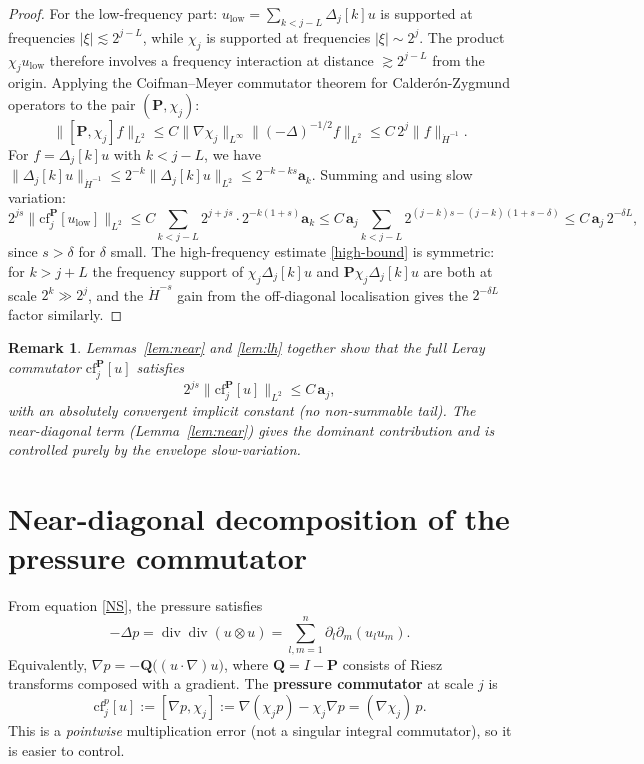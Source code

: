 \documentclass[11pt]{article}
\newtheorem{remark}{Remark}
\theoremstyle{definition}
\newcommand{\PP}{\mathbf{P}}          %
\newcommand{\QQ}{\mathbf{Q}}          %
\newcommand{\Dj}{\Delta_j}            %
\newcommand{\Lp}[1]{L^{#1}}
\newcommand{\norm}[1]{\lVert #1 \rVert}
\newcommand{\abs}[1]{\lvert #1 \rvert}
\newcommand{\divv}{\operatorname{div}}
\newcommand{\cf}{\mathrm{cf}}         %
\newcommand{\env}{\mathbf{a}}         %
\begin{document}
\begin{proof}
For the low-frequency part: $u_{\mathrm{low}} = \sum_{k<j-L}\Dj[k] u$ is
supported at frequencies $\abs{\xi} \lesssim 2^{j-L}$, while $\chi_j$ is
supported at frequencies $\abs{\xi}\sim 2^j$.  The product $\chi_j u_{\mathrm{low}}$
therefore involves a frequency interaction at distance $\gtrsim 2^{j-L}$ from
the origin.  Applying the Coifman--Meyer commutator theorem for Calderón-Zygmund
operators \cite{CoifmanMeyer1978} to the pair $(\PP, \chi_j)$:
\[
  \norm{[\PP,\chi_j]f}_{\Lp{2}} \leq C\norm{\nabla\chi_j}_{\Lp{\infty}}
    \norm{(-\Delta)^{-1/2}f}_{\Lp{2}}
  \leq C\,2^j\norm{f}_{\dot{H}^{-1}}.
\]
For $f = \Dj[k] u$ with $k < j - L$, we have $\norm{\Dj[k] u}_{\dot{H}^{-1}}
\leq 2^{-k}\norm{\Dj[k] u}_{\Lp{2}} \leq 2^{-k-ks}\env_k$.  Summing and
using slow variation:
\[
  2^{js}\norm{\cf_j^{\PP}[u_{\mathrm{low}}]}_{\Lp{2}}
  \leq C\sum_{k<j-L} 2^{j+js}\cdot 2^{-k(1+s)}\env_k
  \leq C\,\env_j\sum_{k<j-L} 2^{(j-k)s-(j-k)(1+s-\delta)}
  \leq C\,\env_j\,2^{-\delta L},
\]
since $s > \delta$ for $\delta$ small.  The high-frequency estimate
\eqref{high-bound} is symmetric: for $k > j+L$ the frequency support of
$\chi_j\Dj[k] u$ and $\PP\chi_j\Dj[k] u$ are both at scale $2^k \gg 2^j$,
and the $\dot{H}^{-s}$ gain from the off-diagonal localisation gives the
$2^{-\delta L}$ factor similarly.
\end{proof}

\begin{remark}
  Lemmas~\ref{lem:near} and \ref{lem:lh} together show that the \emph{full}
  Leray commutator $\cf_j^{\PP}[u]$ satisfies
  \[
    2^{js}\norm{\cf_j^{\PP}[u]}_{\Lp{2}} \leq C\,\env_j,
  \]
  with an \emph{absolutely convergent} implicit constant (no non-summable
  tail).  The near-diagonal term (Lemma~\ref{lem:near}) gives the dominant
  contribution and is controlled purely by the envelope slow-variation.
\end{remark}

\section{Near-diagonal decomposition of the pressure commutator}
\label{sec:pressure-commutator}

From equation \eqref{NS}, the pressure satisfies
\begin{equation}\label{pressure-formula}
  -\Delta p = \divv\divv(u \otimes u)
  = \sum_{l,m=1}^n \partial_l\partial_m(u_l u_m).
\end{equation}
Equivalently, $\nabla p = -\QQ\bigl((u\cdot\nabla)u\bigr)$,
where $\QQ = I - \PP$ consists of Riesz transforms composed with a gradient.
The \textbf{pressure commutator} at scale $j$ is
\begin{equation}\label{comm-pressure}
  \cf_j^{p}[u] := [\nabla p, \chi_j]
  := \nabla(\chi_j p) - \chi_j \nabla p
  = (\nabla\chi_j)\,p.
\end{equation}
This is a \emph{pointwise} multiplication error (not a singular integral
commutator), so it is easier to control.
\end{document}

